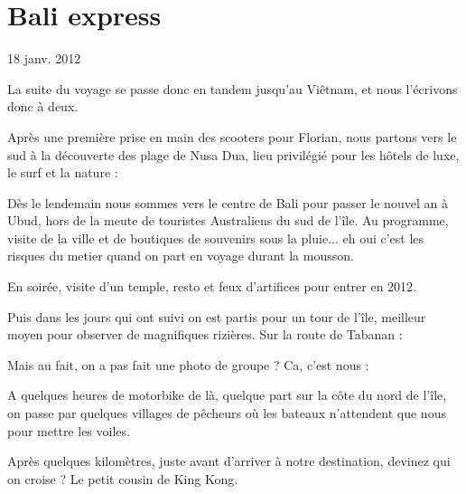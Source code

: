 \section{Bali express}

18 janv. 2012

\begin{multicols}{2}


La suite du voyage se passe donc en tandem jusqu'au Viêtnam, et nous l'écrivons donc à deux.

Après une première prise en main des scooters pour Florian, nous partons vers le sud à la découverte des plage de Nusa Dua, lieu privilégié pour les hôtels de luxe, le surf et la nature :


Dès le lendemain nous sommes vers le centre de Bali pour passer le nouvel an à Ubud, hors de la meute de touristes Australiens du sud de l'île. Au programme, visite de la ville et de boutiques de souvenirs sous la pluie... eh oui c'est les risques du metier quand on part en voyage durant la mousson.


En soirée, visite d'un temple, resto et feux d'artifices pour entrer en 2012.


Puis dans les jours qui ont suivi on est partis pour un tour de l'île, meilleur moyen pour observer de magnifiques rizières. Sur la route de Tabanan :


Mais au fait, on a pas fait une photo de groupe ? Ca, c'est nous :


A quelques heures de motorbike de là, quelque part sur la côte du nord de l'île, on passe par quelques villages de pêcheurs où les bateaux n'attendent que nous pour mettre les voiles.


Après quelques kilomètres, juste avant d'arriver à notre destination, devinez qui on croise ? Le petit cousin de King Kong.


\end{multicols}
